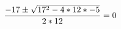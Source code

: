 \documentclass[preview]{standalone}
\begin{document}
\begin{align*}
\special{dvisvgm:raw <g id='unique000'>}\frac{-17 \pm \sqrt{17^2 - 4 * 12 * -5}}{2 * 12} &= 0\special{dvisvgm:raw </g>}
\end{align*}
\end{document}
